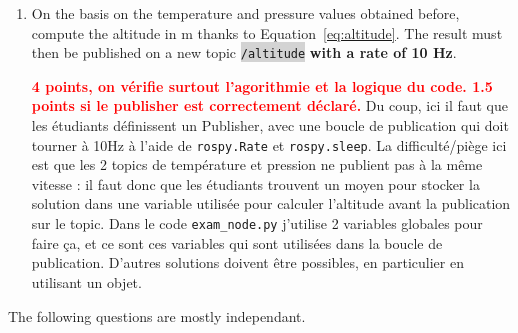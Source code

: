 \documentclass[10pt,a4paper,english]{exam}
\newcounter{mainmemorder}
\newcommand{\save}{\setcounter{mainmemorder}{\value{enumi}}}
\newcommand{\load}{\setcounter{enumi}{\value{mainmemorder}}}
\newcommand{\mytext}[1]{\colorbox{lightgray}{\texttt{#1}}}
\begin{document}
\begin{enumerate}
	\load
	\item On the basis on the temperature and pressure values obtained before, compute the
	      altitude in m thanks to Equation~\eqref{eq:altitude}. The result must then be published on a new
	      topic \mytext{/altitude} \textbf{with a rate of 10 Hz}.
	      \save
	      \begin{solution}\textbf{\textcolor{red}{4 points, on vérifie surtout l'agorithmie et la logique du code. 1.5 points si le publisher est correctement déclaré.}}
		      Du coup, ici il faut que les étudiants définissent un Publisher, avec une boucle de
		      publication qui doit tourner à 10Hz à l'aide de \texttt{rospy.Rate} et
		      \texttt{rospy.sleep}. La difficulté/piège ici est que les 2 topics de température et
		      pression ne publient pas à la même vitesse : il faut donc que les étudiants trouvent un
		      moyen pour stocker la solution dans une variable utilisée pour calculer l'altitude avant
		      la publication sur le topic. Dans le code \texttt{exam\_node.py} j'utilise 2 variables
		      globales pour faire ça, et ce sont ces variables qui sont utilisées dans la boucle de
		      publication. D'autres solutions doivent être possibles, en particulier en utilisant un
		      objet.
	      \end{solution}
\end{enumerate}
The following questions are mostly independant.
\end{document}
